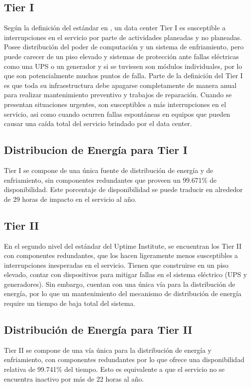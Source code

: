 \documentclass[journal]{IEEEtran}
\begin{document}
\subsection{Tier I}
Según la definición del estándar en \cite{pitt_turner}, un data center Tier I es susceptible a interrupciones en el servicio por parte de actividades  planeadas y no planeadas.
Posee distribución del poder de computación y un sistema de enfriamiento, pero puede carecer de un piso elevado y sistemas de protección ante fallas 
eléctricas como una UPS o un generador y si se tuviesen son módulos individuales, por lo que son potencialmente muchos puntos de falla.
Parte de la definición del Tier I es que toda su infraestructura debe apagarse completamente de manera anual para realizar mantenimiento preventivo y trabajos de reparación.
Cuando se presentan situaciones urgentes, son susceptibles a más interrupciones en el servicio, asi  como cuando ocurren fallas espontáneas en equipos que pueden causar una caída total del servicio brindado por el data center.
\subsection{Distribucion de Energía para Tier I}
Tier I se compone de una única fuente de distribución de energía y de enfriamiento, sin componentes redundantes que proveen un 99.671\% de disponibilidad\cite{pitt_turner}.
Este porcentaje de disponibilidad se puede traducir en alrededor de 29 horas de impacto en el servicio al año.
\subsection{Tier II}
En el segundo nivel del estándar del Uptime Institute, se encuentran los Tier II con componentes redundantes, que los hacen ligeramente menos susceptibles a interrupciones inesperadas en el servicio.
Tienen que construirse en un piso elevado, contar con dispositivos para mitigar fallas en el sistema eléctrico (UPS y generadores). Sin embargo, cuentan con una única vía para la distribución de energía,
por lo que un mantenimiento del mecanismo de distribución de energía require un tiempo de baja total del sistema.
\subsection{Distribución de Energía para Tier II}
Tier II se compone de una vía única para la distribución de energía y enfriamiento, con componentes redundantes por lo que ofrece una disponibilidad relativa de 99.741\% del tiempo. Esto es equivalente a 
que el servicio no se encuentra inactivo por más de 22 horas al año.
\end{document}
